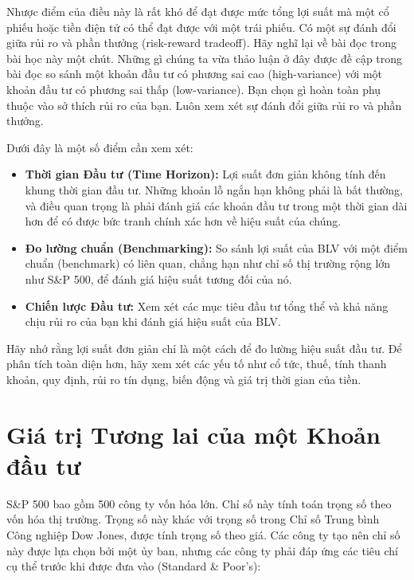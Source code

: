 Nhược điểm của điều này là rất khó để đạt được mức tổng lợi suất mà một cổ phiếu hoặc tiền điện tử có thể đạt được với một trái phiếu. Có một sự đánh đổi giữa rủi ro và phần thưởng (risk-reward tradeoff). Hãy nghĩ lại về bài đọc trong bài học này một chút. Những gì chúng ta vừa thảo luận ở đây được đề cập trong bài đọc so sánh một khoản đầu tư có phương sai cao (high-variance) với một khoản đầu tư có phương sai thấp (low-variance). Bạn chọn gì hoàn toàn phụ thuộc vào sở thích rủi ro của bạn. Luôn xem xét sự đánh đổi giữa rủi ro và phần thưởng.

Dưới đây là một số điểm cần xem xét:

\begin{itemize}
  \item \textbf{Thời gian Đầu tư (Time Horizon):} Lợi suất đơn giản không tính đến khung thời gian đầu tư. Những khoản lỗ ngắn hạn không phải là bất thường, và điều quan trọng là phải đánh giá các khoản đầu tư trong một thời gian dài hơn để có được bức tranh chính xác hơn về hiệu suất của chúng.
  \item \textbf{Đo lường chuẩn (Benchmarking):} So sánh lợi suất của BLV với một điểm chuẩn (benchmark) có liên quan, chẳng hạn như chỉ số thị trường rộng lớn như S\&P 500, để đánh giá hiệu suất tương đối của nó.
  \item \textbf{Chiến lược Đầu tư:} Xem xét các mục tiêu đầu tư tổng thể và khả năng chịu rủi ro của bạn khi đánh giá hiệu suất của BLV.
\end{itemize}
Hãy nhớ rằng lợi suất đơn giản chỉ là một cách để đo lường hiệu suất đầu tư. Để phân tích toàn diện hơn, hãy xem xét các yếu tố như cổ tức, thuế, tính thanh khoản, quy định, rủi ro tín dụng, biến động và giá trị thời gian của tiền.

\section{Giá trị Tương lai của một Khoản đầu tư}

S\&P 500 bao gồm 500 công ty vốn hóa lớn. Chỉ số này tính toán trọng số theo vốn hóa thị trường. Trọng số này khác với trọng số trong Chỉ số Trung bình Công nghiệp Dow Jones, được tính trọng số theo giá. Các công ty tạo nên chỉ số này được lựa chọn bởi một ủy ban, nhưng các công ty phải đáp ứng các tiêu chí cụ thể trước khi được đưa vào (Standard \& Poor's):

